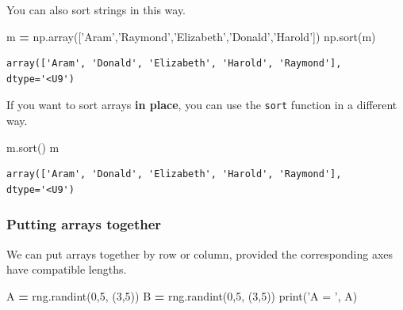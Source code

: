\documentclass[
  letterpaper,
]{scrbook}
\newenvironment{Shaded}{\begin{snugshade}}{\end{snugshade}}
\newcommand{\BuiltInTok}[1]{#1}
\newcommand{\DecValTok}[1]{\textcolor[rgb]{0.00,0.00,0.81}{#1}}
\newcommand{\NormalTok}[1]{#1}
\newcommand{\OperatorTok}[1]{\textcolor[rgb]{0.81,0.36,0.00}{\textbf{#1}}}
\newcommand{\StringTok}[1]{\textcolor[rgb]{0.31,0.60,0.02}{#1}}
\begin{document}
You can also sort strings in this way.

\begin{Shaded}
\begin{Highlighting}[]
\NormalTok{m }\OperatorTok{=}\NormalTok{ np.array([}\StringTok{'Aram'}\NormalTok{,}\StringTok{'Raymond'}\NormalTok{,}\StringTok{'Elizabeth'}\NormalTok{,}\StringTok{'Donald'}\NormalTok{,}\StringTok{'Harold'}\NormalTok{])}
\NormalTok{np.sort(m)}
\end{Highlighting}
\end{Shaded}

\begin{verbatim}
array(['Aram', 'Donald', 'Elizabeth', 'Harold', 'Raymond'], dtype='<U9')
\end{verbatim}

If you want to sort arrays \textbf{in place}, you can use the \texttt{sort} function in a different way.

\begin{Shaded}
\begin{Highlighting}[]
\NormalTok{m.sort()}
\NormalTok{m}
\end{Highlighting}
\end{Shaded}

\begin{verbatim}
array(['Aram', 'Donald', 'Elizabeth', 'Harold', 'Raymond'], dtype='<U9')
\end{verbatim}

\hypertarget{putting-arrays-together}{%
\subsubsection{Putting arrays together}\label{putting-arrays-together}}

We can put arrays together by row or column, provided the corresponding axes have compatible lengths.

\begin{Shaded}
\begin{Highlighting}[]
\NormalTok{A }\OperatorTok{=}\NormalTok{ rng.randint(}\DecValTok{0}\NormalTok{,}\DecValTok{5}\NormalTok{, (}\DecValTok{3}\NormalTok{,}\DecValTok{5}\NormalTok{))}
\NormalTok{B }\OperatorTok{=}\NormalTok{ rng.randint(}\DecValTok{0}\NormalTok{,}\DecValTok{5}\NormalTok{, (}\DecValTok{3}\NormalTok{,}\DecValTok{5}\NormalTok{))}
\BuiltInTok{print}\NormalTok{(}\StringTok{'A = '}\NormalTok{, A)}
\end{Highlighting}
\end{Shaded}
\end{document}
